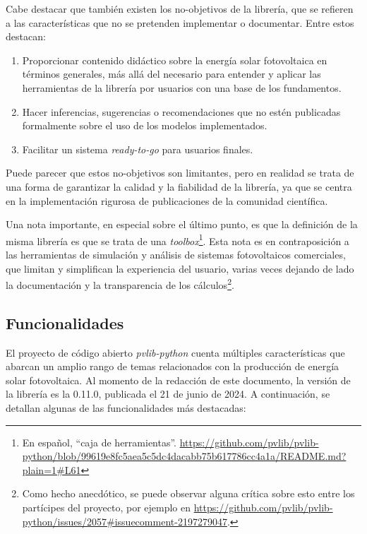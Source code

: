 Cabe destacar que también existen los no-objetivos de la librería, que se refieren a las características que no se pretenden implementar o documentar. Entre estos destacan:

\begin{enumerate}
      \item Proporcionar contenido didáctico sobre la energía solar fotovoltaica en términos generales, más allá del necesario para entender y aplicar las herramientas de la librería por usuarios con una base de los fundamentos.
      \item Hacer inferencias, sugerencias o recomendaciones que no estén publicadas formalmente sobre el uso de los modelos implementados.
      \item Facilitar un sistema \textit{ready-to-go} para usuarios finales.
\end{enumerate}

Puede parecer que estos no-objetivos son limitantes, pero en realidad se trata de una forma de garantizar la calidad y la fiabilidad de la librería, ya que se centra en la implementación rigurosa de publicaciones de la comunidad científica.

Una nota importante, en especial sobre el último punto, es que la definición de la misma librería es que se trata de una \textit{toolbox}\footnote{En español, ``caja de herramientas''. \url{https://github.com/pvlib/pvlib-python/blob/99619e8fc5aea5c5dc4dacabb75b617786cc4a1a/README.md?plain=1\#L61}}. Esta nota es en contraposición a las herramientas de simulación y análisis de sistemas fotovoltaicos comerciales, que limitan y simplifican la experiencia del usuario, varias veces dejando de lado la documentación y la transparencia de los cálculos\footnote{Como hecho anecdótico, se puede observar alguna crítica sobre esto entre los partícipes del proyecto, por ejemplo en \url{https://github.com/pvlib/pvlib-python/issues/2057\#issuecomment-2197279047}.}.

\subsection{Funcionalidades} \label{ssct:pvlib:funcionalidades}

El proyecto de código abierto \textit{pvlib-python} cuenta múltiples características que abarcan un amplio rango de temas relacionados con la producción de energía solar fotovoltaica. Al momento de la redacción de este documento, la versión de la librería es la 0.11.0, publicada el 21 de junio de 2024. A continuación, se detallan algunas de las funcionalidades más destacadas:

